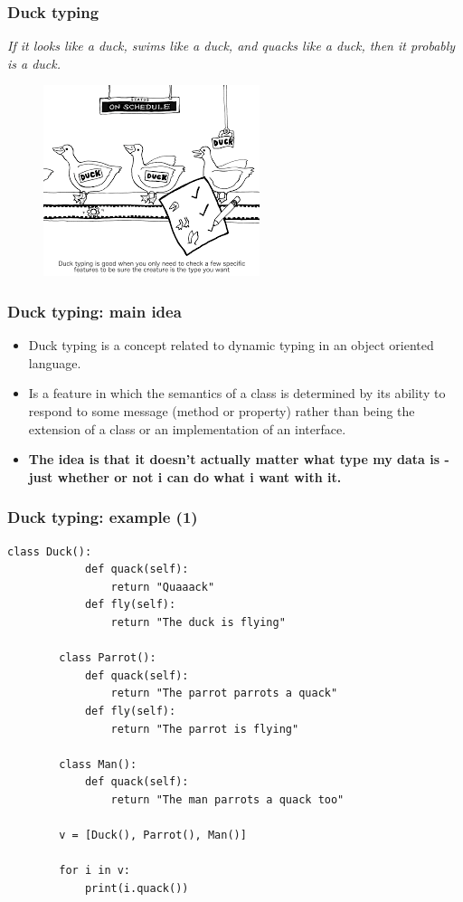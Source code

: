 \documentclass[xcolor ={table,usenames,dvipsnames}]{beamer}
\theoremstyle{definition}
\begin{document}
	\begin{frame}
		\frametitle{Duck typing}
		\textit{ If it looks like a duck, swims like a duck, and quacks like a duck, then it probably is a duck.}\\
		\begin{figure}[h!]
			\centering
			\includegraphics[scale=0.85]{img/duck.png}
			\label{Interfacce di un CS}
		\end{figure}
	\end{frame}

	\begin{frame}
		\frametitle{Duck typing: main idea}
		\begin{itemize}
			\item 	Duck typing is a concept related to dynamic typing in an object oriented language. 
			\item Is a feature in which the semantics of a class is determined by its ability to respond to some message (method or property) rather than being the extension of a class or an implementation of an interface. \\
			\item \textbf{The idea is that it doesn't actually matter what type my data is - just whether or not i can do what i want with it.}
		\end{itemize}
	\end{frame}

	\begin{frame}[fragile]
		\frametitle{Duck typing: example (1)}
		\begin{lstlisting}[basicstyle=\fontsize{2}{4}\selectfont\ttfamily\tiny]
		class Duck():
			def quack(self):
				return "Quaaack"
			def fly(self):
				return "The duck is flying"
		
		class Parrot():
			def quack(self):
				return "The parrot parrots a quack"
			def fly(self):
				return "The parrot is flying"
		
		class Man():
			def quack(self):
				return "The man parrots a quack too"

		v = [Duck(), Parrot(), Man()]
		
		for i in v:
			print(i.quack())
		\end{lstlisting}
	\end{frame}
\end{document}
